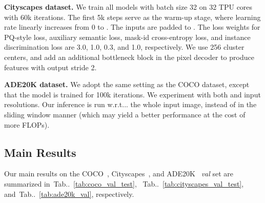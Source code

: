 \documentclass[runningheads]{llncs}
\makeatletter
\DeclareRobustCommand\onedot{\futurelet\@let@token\@onedot}
\def\@onedot{\ifx\@let@token.\else.\null\fi\xspace}
\def\wrt{w.r.t\onedot} \def\dof{d.o.f\onedot}
\newcommand{\tabref}[1]{Tab\onedot~\ref{#1}}
\makeatother
\begin{document}
\textbf{Cityscapes dataset.}\quad
We train all models with batch size 32 on 32 TPU cores with 60k iterations. The first 5k steps serve as the warm-up stage, where learning rate linearly increases from 0 to . The inputs are padded to .
The loss weights for PQ-style loss, auxiliary semantic loss, mask-id cross-entropy loss, and instance discrimination loss are 3.0, 1.0, 0.3, and 1.0, respectively.
We use 256 cluster centers, and add an additional bottleneck block in the pixel decoder to produce features with output stride 2.

\textbf{ADE20K dataset.}\quad
We adopt the same setting as the COCO dataset, except that the model is trained for 100k iterations. We experiment with both  and  input resolutions. Our inference is run \wrt. the whole input image, instead of in the sliding window manner (which may yield a better performance at the cost of more FLOPs).

\subsection{Main Results}
Our main results on the COCO~\cite{lin2014microsoft},  Cityscapes~\cite{Cordts2016Cityscapes}, and
ADE20K~\cite{zhou2017scene} \textit{val} set are summarized in~\tabref{tab:coco_val_test}, ~\tabref{tab:cityscapes_val_test}, and~\tabref{tab:ade20k_val}, respectively.
\end{document}
